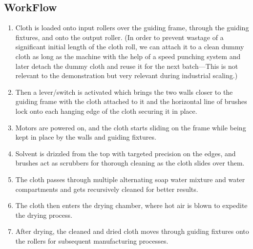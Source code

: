 \documentclass[table]{rapportCS}
\begin{document}
\subsection{WorkFlow}
\begin{enumerate}[label=$\bullet$]

    \item Cloth is loaded onto input rollers over the guiding frame, through the guiding fixtures, and onto the output roller. (In order to prevent wastage of a significant initial length of the cloth roll, we can attach it to a clean dummy cloth as long as the machine with the help of a speed punching system and later detach the dummy cloth and reuse it for the next batch—This is not relevant to the demonstration but very relevant during industrial scaling.)

    \item Then a lever/switch is activated which brings the two walls closer to the guiding frame with the cloth attached to it and the horizontal line of brushes lock onto each hanging edge of the cloth securing it in place.

    \item Motors are powered on, and the cloth starts sliding on the frame while being kept in place by the walls and guiding fixtures.

    \item Solvent is drizzled from the top with targeted precision on the edges, and brushes act as scrubbers for thorough cleaning as the cloth slides over them.

    \item The cloth passes through multiple alternating soap water mixture and water compartments and gets recursively cleaned for better results.

    \item The cloth then enters the drying chamber, where hot air is blown to expedite the drying process.

    \item After drying, the cleaned and dried cloth moves through guiding fixtures onto the rollers for subsequent manufacturing processes.

\end{enumerate}
\end{document}
